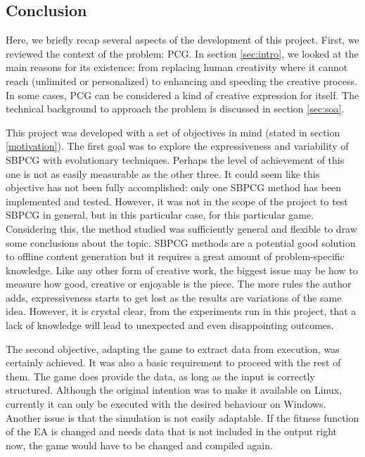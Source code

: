 \subsection{Conclusion}

Here, we briefly recap several aspects of the development of this project. First, we reviewed the context of the problem: PCG. In section \ref{sec:intro}, we looked at the main reasons for its existence: from replacing human creativity where it cannot reach (unlimited or personalized) to enhancing and speeding the creative process. In some cases, PCG can  be considered a kind of creative expression for itself. The technical background to approach the problem is discussed in section \ref{sec:soa}.


This project was developed with a set of objectives in mind (stated in section \ref{motivation}). The first goal was to explore the expressiveness and variability of SBPCG with evolutionary techniques. Perhaps the level of achievement of this one is not as easily measurable as the other three. It could seem like this objective has not been fully accomplished: only one SBPCG method has been implemented and tested. However, it was not in the scope of the project to test SBPCG in general, but in this particular case, for this particular game. Considering this, the method studied was sufficiently general and flexible to draw some conclusions about the topic. SBPCG methods are a potential good solution to offline content generation but it requires a great amount of problem-specific knowledge. Like any other form of creative work, the biggest issue may be how to measure how good, creative or enjoyable is the piece. The more rules the author adds, expressiveness starts to get lost as the results are variations of the same idea. However, it is crystal clear, from the experiments run in this project, that a lack of knowledge will lead to unexpected and even disappointing outcomes.

The second objective, adapting the game to extract data from execution, was certainly achieved. It was also a basic requirement to proceed with the rest of them. The game does provide the data, as long as the input is correctly structured. Although the original intention was to make it available on Linux, currently it can only be executed with the desired behaviour on Windows. Another issue is that the simulation is not easily adaptable. If the fitness function of the EA is changed and needs data that is not included in the output right now, the game would have to be changed and compiled again.

